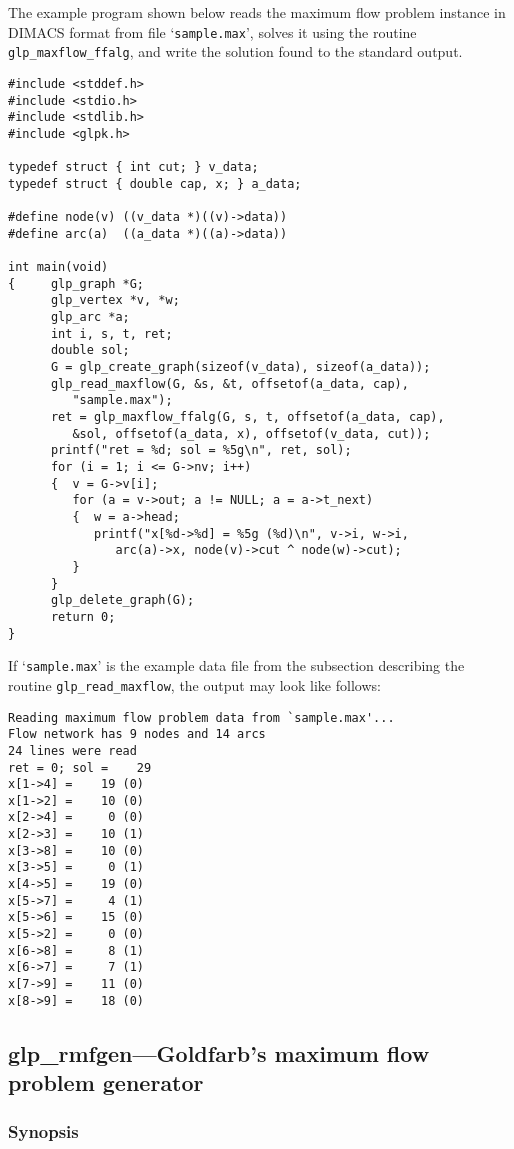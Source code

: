 The example program shown below reads the maximum flow problem instance
in DIMACS format from file `\verb|sample.max|', solves it using the
routine \verb|glp_maxflow_ffalg|, and write the solution found to the
standard output.

\begin{verbatim}
#include <stddef.h>
#include <stdio.h>
#include <stdlib.h>
#include <glpk.h>

typedef struct { int cut; } v_data;
typedef struct { double cap, x; } a_data;

#define node(v) ((v_data *)((v)->data))
#define arc(a)  ((a_data *)((a)->data))

int main(void)
{     glp_graph *G;
      glp_vertex *v, *w;
      glp_arc *a;
      int i, s, t, ret;
      double sol;
      G = glp_create_graph(sizeof(v_data), sizeof(a_data));
      glp_read_maxflow(G, &s, &t, offsetof(a_data, cap),
         "sample.max");
      ret = glp_maxflow_ffalg(G, s, t, offsetof(a_data, cap),
         &sol, offsetof(a_data, x), offsetof(v_data, cut));
      printf("ret = %d; sol = %5g\n", ret, sol);
      for (i = 1; i <= G->nv; i++)
      {  v = G->v[i];
         for (a = v->out; a != NULL; a = a->t_next)
         {  w = a->head;
            printf("x[%d->%d] = %5g (%d)\n", v->i, w->i,
               arc(a)->x, node(v)->cut ^ node(w)->cut);
         }
      }
      glp_delete_graph(G);
      return 0;
}
\end{verbatim}

If `\verb|sample.max|' is the example data file from the subsection
describing the routine \verb|glp_read_maxflow|, the output may look like
follows:

\begin{verbatim}
Reading maximum flow problem data from `sample.max'...
Flow network has 9 nodes and 14 arcs
24 lines were read
ret = 0; sol =    29
x[1->4] =    19 (0)
x[1->2] =    10 (0)
x[2->4] =     0 (0)
x[2->3] =    10 (1)
x[3->8] =    10 (0)
x[3->5] =     0 (1)
x[4->5] =    19 (0)
x[5->7] =     4 (1)
x[5->6] =    15 (0)
x[5->2] =     0 (0)
x[6->8] =     8 (1)
x[6->7] =     7 (1)
x[7->9] =    11 (0)
x[8->9] =    18 (0)
\end{verbatim}

\newpage

\subsection{glp\_rmfgen---Goldfarb's maximum flow problem generator}

\subsubsection*{Synopsis}

